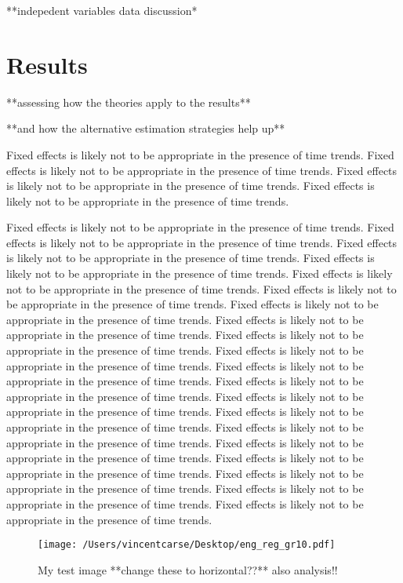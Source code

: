 \documentclass[11pt]{article}
\begin{document}
**indepedent variables data discussion*


\section{Results}


**assessing how the theories apply to the results**

**and how the alternative estimation strategies help up**

Fixed effects is likely not to be appropriate in the presence of time trends. 
Fixed effects is likely not to be appropriate in the presence of time trends. 
Fixed effects is likely not to be appropriate in the presence of time trends. 
Fixed effects is likely not to be appropriate in the presence of time trends. 

Fixed effects is likely not to be appropriate in the presence of time trends. 
Fixed effects is likely not to be appropriate in the presence of time trends. 
Fixed effects is likely not to be appropriate in the presence of time trends. 
Fixed effects is likely not to be appropriate in the presence of time trends. 
Fixed effects is likely not to be appropriate in the presence of time trends. 
Fixed effects is likely not to be appropriate in the presence of time trends. 
Fixed effects is likely not to be appropriate in the presence of time trends. 
Fixed effects is likely not to be appropriate in the presence of time trends. 
Fixed effects is likely not to be appropriate in the presence of time trends. 
Fixed effects is likely not to be appropriate in the presence of time trends. 
Fixed effects is likely not to be appropriate in the presence of time trends. 
Fixed effects is likely not to be appropriate in the presence of time trends. 
Fixed effects is likely not to be appropriate in the presence of time trends. 
Fixed effects is likely not to be appropriate in the presence of time trends. 
Fixed effects is likely not to be appropriate in the presence of time trends. 
Fixed effects is likely not to be appropriate in the presence of time trends. 
Fixed effects is likely not to be appropriate in the presence of time trends. 
Fixed effects is likely not to be appropriate in the presence of time trends. 
Fixed effects is likely not to be appropriate in the presence of time trends. 
Fixed effects is likely not to be appropriate in the presence of time trends. 


\begin{figure}
    \label{image-myimage}
    \texttt{[image: /Users/vincentcarse/Desktop/eng\_reg\_gr10.pdf]}
    \caption{My test image **change these to horizontal??** also analysis!!}
\end{figure}
\end{document}
